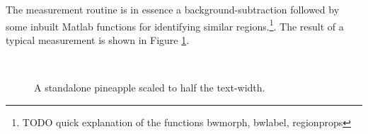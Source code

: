 The measurement routine is in essence a background-subtraction followed by some
inbuilt Matlab functions for identifying similar regions.\footnote{TODO quick
explanation of the functions bwmorph, bwlabel, regionprops}. The result of a
typical measurement is shown in Figure \ref{fig:observation}.

\begin{figure}[h]
\centering
{}
 \\
\caption{A standalone pineapple scaled to half the text-width.}
\label{fig:observation}
\end{figure}


